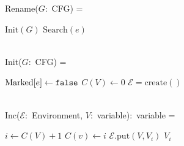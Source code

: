 
Rename($G$:~CFG) =
\begin{myalgorithmic}
\STATE $\text{Init}(G)$
 \STATE $\text{Search}(e)$
\ENDFOR
\end{myalgorithmic}
~\\
Init($G$:~CFG) =
\begin{myalgorithmic}
 \STATE $\text{Marked}[e] \gets \texttt{false}$
\ENDFOR
{}
 \STATE $C(V) \gets 0$
\ENDFOR
\STATE $\mathcal{E} = \text{create}()$ 
\end{myalgorithmic}
~\\
Inc($\mathcal{E}$:~Environment, $V$:~variable):~variable =
\begin{myalgorithmic}
\STATE $i \gets C(V) + 1$
\STATE $C(v) \gets i$
\STATE $\mathcal{E}.\text{put}(V, V_i)$
\RETURN $V_i$
\end{myalgorithmic}
